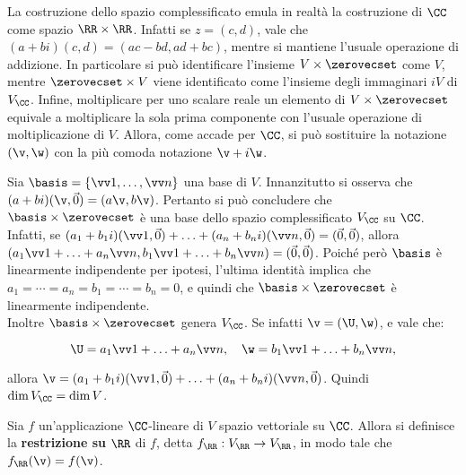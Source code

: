 \documentclass[11pt]{article}
\begin{document}
	\begin{remark}
		La costruzione dello spazio complessificato emula in realtà la costruzione di $\CC$ come spazio
		$\RR \times \RR$. Infatti se $z = (c, d)$, vale che $(a + bi)(c, d) = (ac - bd, ad + bc)$, mentre
		si mantiene l'usuale operazione di addizione. In particolare si può identificare l'insieme
		$V \times \zerovecset$ come $V$, mentre $\zerovecset \times V$ viene identificato come l'insieme
		degli immaginari $iV$ di $V_\CC$. Infine, moltiplicare per uno scalare reale un elemento di
		$V \times \zerovecset$ equivale a moltiplicare la sola prima componente con l'usuale operazione
		di moltiplicazione di $V$. Allora, come accade per $\CC$, si può sostituire la notazione
		$(\v, \w)$ con la più comoda notazione $\v + i \w$.
	\end{remark}

	\begin{remark}
		Sia $\basis = \{ \vv 1, \ldots, \vv n \}$ una base di $V$. Innanzitutto si osserva che
		$(a+bi)(\v, \vec 0) = (a\v, b\v)$. Pertanto si può concludere che $\basis \times \zerovecset$ è
		una base dello spazio complessificato $V_\CC$ su $\CC$. \\
		
		Infatti, se $(a_1 + b_1 i)(\vv 1, \vec 0) + \ldots + (a_n + b_n i)(\vv n, \vec 0) = (\vec 0, \vec 0)$,
		allora $(a_1 \vv 1 + \ldots + a_n \vv n, b_1 \vv 1 + \ldots + b_n \vv n) = (\vec 0, \vec 0)$.
		Poiché però $\basis$ è linearmente indipendente per ipotesi, l'ultima identità implica che
		$a_1 = \cdots = a_n = b_1 = \cdots = b_n = 0$, e quindi che $\basis \times \zerovecset$ è linearmente
		indipendente. \\
		
		Inoltre $\basis \times \zerovecset$ genera $V_\CC$. Se infatti $\v = (\U, \w)$, e vale che:
		
		\[ \U = a_1 \vv 1 + \ldots + a_n \vv n, \quad \w = b_1 \vv 1 + \ldots + b_n \vv n, \]
		
		\vskip 0.1in
		
		allora $\v = (a_1 + b_1 i) (\vv 1, \vec 0) + \ldots + (a_n + b_n i) (\vv n, \vec 0)$. Quindi
		$\dim V_\CC = \dim V$.
	\end{remark}

	\begin{definition}
		Sia $f$ un'applicazione $\CC$-lineare di $V$ spazio vettoriale su $\CC$. Allora
		si definisce la \textbf{restrizione su} $\RR$ di $f$, detta $f_\RR : V_\RR \to V_\RR$,
		in modo tale che $f_\RR(\v) = f(\v)$.
	\end{definition}
\end{document}
